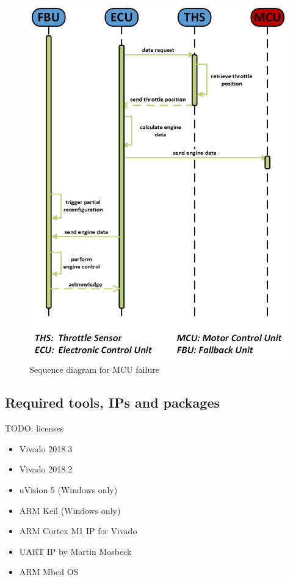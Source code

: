 \begin{figure}[h!]
    \centering
    \includegraphics[width=\textwidth]{figures/sequence_mcu_fail.png}
    \caption{Sequence diagram for \gls{MCU} failure}\label{fig:sequenceMCUFailure}
\end{figure}

\subsection{Required tools, \glspl{IP} and packages}
TODO: licenses
\begin{itemize}
    \item Vivado 2018.3
    \item Vivado 2018.2
    \item uVision 5 (Windows only)
    \item ARM Keil (Windows only)
    \item ARM Cortex M1 IP for Vivado
    \item UART IP by Martin Mosbeck
    \item ARM Mbed OS
\end{itemize}

